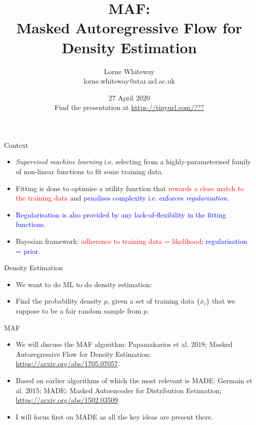 \documentclass[usenames,dvipsnames]{beamer}
\title{MAF: \\ Masked Autoregressive Flow for Density Estimation}
\author{Lorne Whiteway \\ lorne.whiteway@star.ucl.ac.uk}
\institute{Astrophysics Group \\ Department of Physics and Astronomy \\ University College London}
\date{27 April 2020 \\ Find the presentation at \alert{\url{https://tinyurl.com/???}}}
\begin{document}
\frame{\titlepage}

\begin{frame}{Context}
  \begin{block}{}
    \begin{itemize}
      \item{\textit{Supervised machine learning} i.e. selecting from a highly-parameterised family of non-linear functions to fit some training data.}
      \item{Fitting is done to optimise a utility function that \textcolor{red}{rewards a close match to the training data} and \textcolor{blue}{penalises complexity i.e. enforces \textit{regularization}}.}
      \item{\textcolor{blue}{Regularisation is also provided by any lack-of-flexibility in the fitting functions.}}
      \item{Bayesian framework: \textcolor{red}{adherence to training data = likelihood}; \textcolor{blue}{regularisation = prior}.}
    \end{itemize}
  \end{block}
\end{frame}

\begin{frame}{Density Estimation}
  \begin{block}{}
    \begin{itemize}
      \item{We want to do ML to do density estimation:}
      \item{Find the probability density $p$, given a set of training data $\{x_i\}$ that we suppose to be a fair random sample from $p$.}
    \end{itemize}
  \end{block}
\end{frame}

\begin{frame}{MAF}
  \begin{block}{}
    \begin{itemize}
      \item{We will discuss the MAF algorithm: Papamakarios et al. 2018; Masked Autoregressive Flow for Density Estimation; \url{https://arxiv.org/abs/1705.07057}.}
      \item{Based on earlier algorithms of which the most relevant is MADE: Germain et al. 2015; MADE: Masked Autoencoder for Distribution Estimation; \url{https://arxiv.org/abs/1502.03509}.}
	\item{I will focus first on MADE as all the key ideas are present there.}
    \end{itemize}
  \end{block}
\end{frame}
\end{document}
